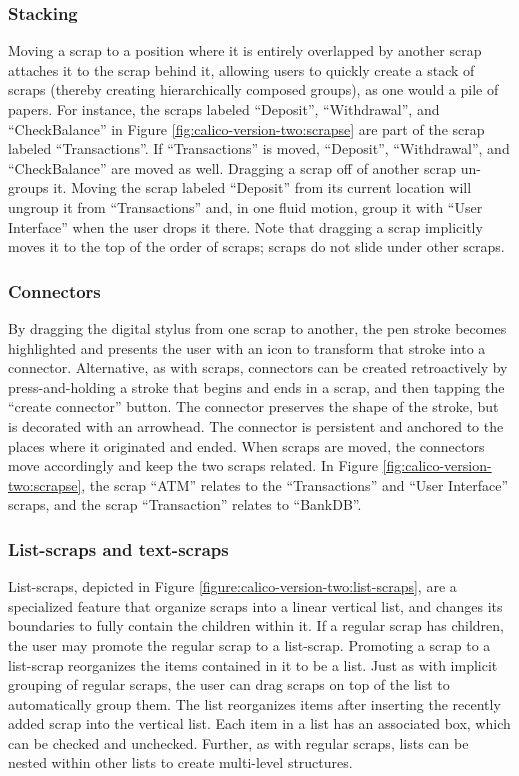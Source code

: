 \documentclass[12pt,fleqn]{ucithesis}
\begin{document}
\subsubsection{Stacking} Moving a scrap to a position where it is entirely overlapped by another scrap attaches it to the scrap behind it, allowing users to quickly create a stack of scraps (thereby creating hierarchically composed groups), as one would a pile of papers. For instance, the scraps labeled ``Deposit'', ``Withdrawal'', and ``CheckBalance'' in Figure \ref{fig:calico-version-two:scrapse} are part of the scrap labeled ``Transactions''. If ``Transactions'' is moved, ``Deposit'', ``Withdrawal'', and ``CheckBalance'' are moved as well. Dragging a scrap off of another scrap un-groups it. Moving the scrap labeled ``Deposit'' from its current location will ungroup it from ``Transactions'' and, in one fluid motion, group it with ``User Interface'' when the user drops it there. Note that dragging a scrap implicitly moves it to the top of the order of scraps; scraps do not slide under other scraps.

\subsubsection{Connectors} By dragging the digital stylus from one scrap to another, the pen stroke becomes highlighted and presents the user with an icon to transform that stroke into a connector. Alternative, as with scraps, connectors can be created retroactively by press-and-holding a stroke that begins and ends in a scrap, and then tapping the ``create connector'' button. The connector preserves the shape of the stroke, but is decorated with an arrowhead. The connector is persistent and anchored to the places where it originated and ended. When scraps are moved, the connectors move accordingly and keep the two scraps related. In Figure \ref{fig:calico-version-two:scrapse}, the scrap ``ATM'' relates to the ``Transactions'' and ``User Interface'' scraps, and the scrap ``Transaction'' relates to ``BankDB''.

\subsubsection{List-scraps and text-scraps} List-scraps, depicted in Figure \ref{figure:calico-version-two:list-scraps}, are a specialized feature that organize scraps into a linear vertical list, and changes its boundaries to fully contain the children within it. If a regular scrap has children, the user may promote the regular scrap to a list-scrap. Promoting a scrap to a list-scrap reorganizes the items contained in it to be a list. Just as with implicit grouping of regular scraps, the user can drag scraps on top of the list to automatically group them. The list reorganizes items after inserting the recently added scrap into the vertical list. Each item in a list has an associated box, which can be checked and unchecked. Further, as with regular scraps, lists can be nested within other lists to create multi-level structures.
\end{document}
